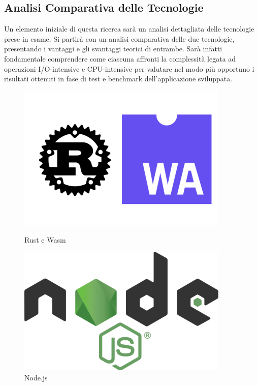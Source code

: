 \subsection{Analisi Comparativa delle Tecnologie}
Un elemento iniziale di questa ricerca sarà un analisi dettagliata delle tecnologie prese in esame. 
Si partirà con un analisi comparativa delle due tecnologie, presentando i vantaggi e gli svantaggi teorici di entrambe. Sarà infatti fondamentale comprendere come ciascuna affronti la complessità legata ad operazioni I/O-intensive e CPU-intensive per valutare nel modo più opportuno i risultati ottenuti in fase di test e benchmark dell'applicazione sviluppata.
\begin{figure}
        \centering
        \begin{minipage}{0.40\textwidth}
            \centering
            \includegraphics[width=0.9\textwidth]{images/rustwasm.jpg} %
            \caption{Rust e Wasm}
        \end{minipage}\hfill
        \begin{minipage}{0.40\textwidth}
            \centering
            \includegraphics[width=0.9\textwidth]{images/node.png} %
            \caption{Node.js}
        \end{minipage}
    \end{figure}
